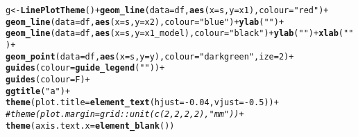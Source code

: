 \documentclass{article}\usepackage[]{graphicx}\usepackage[]{color}
\makeatletter
\newcommand{\hlnum}[1]{\textcolor[rgb]{0.686,0.059,0.569}{#1}}%
\newcommand{\hlstr}[1]{\textcolor[rgb]{0.192,0.494,0.8}{#1}}%
\newcommand{\hlcom}[1]{\textcolor[rgb]{0.678,0.584,0.686}{\textit{#1}}}%
\newcommand{\hlopt}[1]{\textcolor[rgb]{0,0,0}{#1}}%
\newcommand{\hlstd}[1]{\textcolor[rgb]{0.345,0.345,0.345}{#1}}%
\newcommand{\hlkwb}[1]{\textcolor[rgb]{0.69,0.353,0.396}{#1}}%
\newcommand{\hlkwc}[1]{\textcolor[rgb]{0.333,0.667,0.333}{#1}}%
\newcommand{\hlkwd}[1]{\textcolor[rgb]{0.737,0.353,0.396}{\textbf{#1}}}%
\newenvironment{kframe}{%
 \def\at@end@of@kframe{}%
 \ifinner\ifhmode%
  \def\at@end@of@kframe{\end{minipage}}%
  \begin{minipage}{\columnwidth}%
 \fi\fi%
 \def\FrameCommand##1{\hskip\@totalleftmargin \hskip-\fboxsep
 \colorbox{shadecolor}{##1}\hskip-\fboxsep
     \hskip-\linewidth \hskip-\@totalleftmargin \hskip\columnwidth}%
 \MakeFramed {\advance\hsize-\width
   \@totalleftmargin\z@ \linewidth\hsize
   \@setminipage}}%
 {\par\unskip\endMakeFramed%
 \at@end@of@kframe}
\newenvironment{knitrout}{}{} %
\makeatother
\begin{document}
\begin{knitrout}
\color{fgcolor}\begin{kframe}
\begin{alltt}
\hlstd{g} \hlkwb{<-} \hlkwd{LinePlotTheme}\hlstd{()} \hlopt{+} \hlkwd{geom_line}\hlstd{(}\hlkwc{data}\hlstd{=df,}\hlkwd{aes}\hlstd{(}\hlkwc{x}\hlstd{=s,}\hlkwc{y}\hlstd{=x1),}\hlkwc{colour}\hlstd{=}\hlstr{"red"}\hlstd{)} \hlopt{+}
     \hlkwd{geom_line}\hlstd{(}\hlkwc{data}\hlstd{=df,}\hlkwd{aes}\hlstd{(}\hlkwc{x}\hlstd{=s,}\hlkwc{y}\hlstd{=x2),}\hlkwc{colour}\hlstd{=}\hlstr{"blue"}\hlstd{)} \hlopt{+} \hlkwd{ylab}\hlstd{(}\hlstr{""}\hlstd{)} \hlopt{+}
     \hlkwd{geom_line}\hlstd{(}\hlkwc{data}\hlstd{=df,}\hlkwd{aes}\hlstd{(}\hlkwc{x}\hlstd{=s,}\hlkwc{y}\hlstd{=x1_model),}\hlkwc{colour}\hlstd{=}\hlstr{"black"}\hlstd{)} \hlopt{+} \hlkwd{ylab}\hlstd{(}\hlstr{""}\hlstd{)} \hlopt{+} \hlkwd{xlab}\hlstd{(}\hlstr{""}\hlstd{)} \hlopt{+}
     \hlkwd{geom_point}\hlstd{(}\hlkwc{data}\hlstd{=df,}\hlkwd{aes}\hlstd{(}\hlkwc{x}\hlstd{=s,}\hlkwc{y}\hlstd{=y),}\hlkwc{colour}\hlstd{=}\hlstr{"dark green"}\hlstd{,}\hlkwc{ize}\hlstd{=}\hlnum{2}\hlstd{)} \hlopt{+}
     \hlkwd{guides}\hlstd{(}\hlkwc{colour}\hlstd{=}\hlkwd{guide_legend}\hlstd{(}\hlstr{""}\hlstd{))}  \hlopt{+}
     \hlkwd{guides}\hlstd{(}\hlkwc{colour}\hlstd{=F)} \hlopt{+}
     \hlkwd{ggtitle}\hlstd{(}\hlstr{"a"}\hlstd{)} \hlopt{+}
     \hlkwd{theme}\hlstd{(}\hlkwc{plot.title} \hlstd{=} \hlkwd{element_text}\hlstd{(}\hlkwc{hjust} \hlstd{=} \hlopt{-}\hlnum{0.04}\hlstd{,}\hlkwc{vjust}\hlstd{=}\hlopt{-}\hlnum{0.5}\hlstd{))} \hlopt{+}
     \hlcom{#theme(plot.margin=grid::unit(c(2,2,2,2),"mm")) +}
     \hlkwd{theme}\hlstd{(}\hlkwc{axis.text.x}\hlstd{=}\hlkwd{element_blank}\hlstd{())}


\end{alltt}
\end{kframe}
\end{knitrout}
\end{document}
